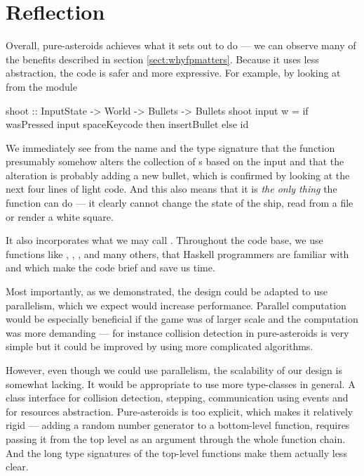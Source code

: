 \documentclass[
  digital, %
  color,   %
  table,   %
  oneside, %
  lof,     %
  lot,     %
]{fithesis3}
\begin{document}
{%
\section{Reflection}
\label{sect:purereflection}

Overall, pure-asteroids achieves what it sets out to do --- we can observe
many of the benefits described in section \ref{sect:whyfpmatters}.
Because it uses less abstraction, the code is safer and more expressive.
For example, by looking at  from the  module
\begin{haskell}
shoot :: InputState -> World -> Bullets -> Bullets
shoot input w =
    if wasPressed input spaceKeycode
        then insertBullet
        else id
\end{haskell}
We immediately see from the name and the type signature that the function presumably
somehow alters the collection of s based on the input and that
the alteration is probably adding a new bullet, which is confirmed by looking
at the next four lines of light code. And this also means that it is \emph{the only thing}
the function can do --- it clearly cannot change the state of the ship, read from a file
or render a white square.

It also incorporates what we may call .
Throughout the code base, we use functions like , ,
,  and many others, that Haskell programmers are familiar
with and which make the code brief and save us time.

Most importantly, as we demonstrated, the design could be adapted to
use parallelism, which we expect would increase performance.
Parallel computation would be especially beneficial if the game was of larger scale
and the computation was more demanding --- for instance collision detection
in pure-asteroids is very simple but it could be improved by using more
complicated algorithms.

However, even though we could use parallelism, the scalability of our design is somewhat lacking.
It would be appropriate to use more type-classes in general. A class interface for
collision detection, stepping, communication using events and for resources abstraction.
Pure-asteroids is too explicit, which makes it relatively rigid
--- adding a random number
generator to a bottom-level function, requires passing it from the top level
as an argument through the whole function chain. And the long type signatures of the
top-level functions make them actually less clear.

}
\end{document}
